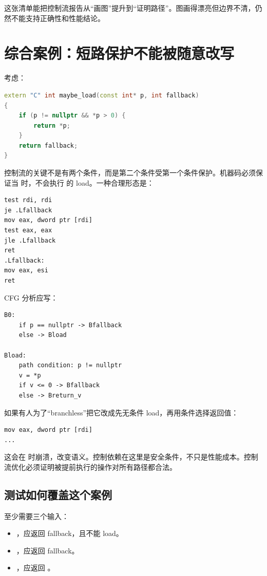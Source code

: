 这张清单能把控制流报告从“画图”提升到“证明路径”。图画得漂亮但边界不清，仍然不能支持正确性和性能结论。

\section{综合案例：短路保护不能被随意改写}

考虑：

\begin{lstlisting}[language=C++]
extern "C" int maybe_load(const int* p, int fallback)
{
    if (p != nullptr && *p > 0) {
        return *p;
    }
    return fallback;
}
\end{lstlisting}

控制流的关键不是有两个条件，而是第二个条件受第一个条件保护。机器码必须保证当  时，不会执行  的 load。一种合理形态是：

\begin{lstlisting}
test rdi, rdi
je .Lfallback
mov eax, dword ptr [rdi]
test eax, eax
jle .Lfallback
ret
.Lfallback:
mov eax, esi
ret
\end{lstlisting}

CFG 分析应写：

\begin{lstlisting}
B0:
    if p == nullptr -> Bfallback
    else -> Bload

Bload:
    path condition: p != nullptr
    v = *p
    if v <= 0 -> Bfallback
    else -> Breturn_v
\end{lstlisting}

如果有人为了“branchless”把它改成先无条件 load，再用条件选择返回值：

\begin{lstlisting}
mov eax, dword ptr [rdi]
...
\end{lstlisting}

这会在  时崩溃，改变语义。控制依赖在这里是安全条件，不只是性能成本。控制流优化必须证明被提前执行的操作对所有路径都合法。

\subsection{测试如何覆盖这个案例}

至少需要三个输入：

\begin{itemize}
  \item {}，应返回 fallback，且不能 load。
  \item {}，应返回 fallback。
  \item {}，应返回 。
\end{itemize}

